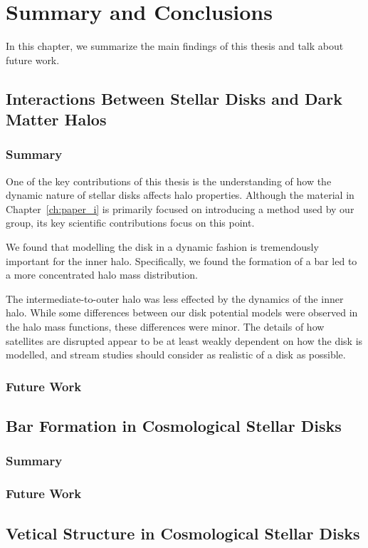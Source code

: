 \chapter{Summary and Conclusions}\label{ch:Conclusion}

In this chapter, we summarize the  main findings of this thesis and talk about future work.


\section{Interactions Between Stellar Disks and Dark Matter Halos}


\subsection{Summary}

One of the key contributions of this thesis is the understanding of how the dynamic nature of stellar disks affects halo properties. Although the material in Chapter~\ref{ch:paper_i} is primarily focused on introducing a method used by our group, its key scientific contributions focus on this point.

We found that modelling the disk in a dynamic fashion is tremendously important for the inner halo. Specifically, we found the formation of a bar led to a more concentrated halo mass distribution.

The intermediate-to-outer halo was less effected by the dynamics of the inner halo. While some differences between our disk potential models were observed in the halo mass functions, these differences were minor. The details of how satellites are disrupted appear to be at least weakly dependent on how the disk is modelled, and stream studies should consider as realistic of a disk as possible.

\subsection{Future Work}

\section{Bar Formation in Cosmological Stellar Disks}
\subsection{Summary}

\subsection{Future Work}
\section{Vetical Structure in Cosmological Stellar Disks}
